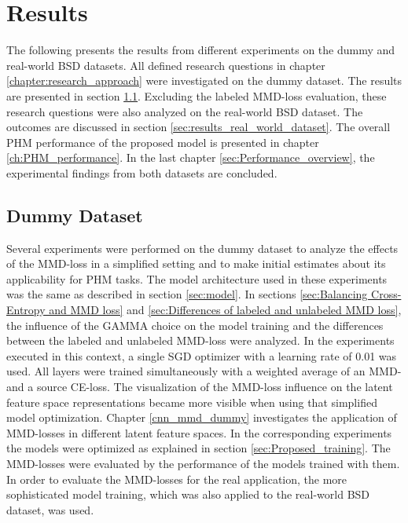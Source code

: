 \chapter{Results}\label{sec:results}

The following presents the results from different experiments on the dummy and real-world BSD datasets. All defined research questions in chapter \ref{chapter:research_approach} were investigated on the dummy dataset. The results are presented in section \ref{sec:results_dummy_dataset}. Excluding the labeled MMD-loss evaluation, these research questions were also analyzed on the real-world BSD dataset. The outcomes are discussed in section \ref{sec:results_real_world_dataset}. The overall PHM performance of the proposed model is presented in chapter \ref{ch:PHM_performance}. In the last chapter \ref{sec:Performance_overview}, the experimental findings from both datasets are concluded.




\section{Dummy Dataset}\label{sec:results_dummy_dataset}
Several experiments were performed on the dummy dataset to analyze the effects of the MMD-loss in a simplified setting and to make initial estimates about its applicability for PHM tasks. The model architecture used in these experiments was the same as described in section \ref{sec:model}. In sections \ref{sec:Balancing Cross-Entropy and MMD loss} and \ref{sec:Differences of labeled and unlabeled MMD loss}, the influence of the GAMMA choice on the model training and the differences between the labeled and unlabeled MMD-loss were analyzed. In the experiments executed in this context, a single SGD optimizer with a learning rate of 0.01 was used. All layers were trained simultaneously with a weighted average of an MMD- and a source CE-loss. The visualization of the MMD-loss influence on the latent feature space representations became more visible when using that simplified model optimization. Chapter \ref{cnn_mmd_dummy} investigates the application of MMD-losses in different latent feature spaces. In the corresponding experiments the models were optimized as explained in section \ref{sec:Proposed_training}. The MMD-losses were evaluated by the performance of the models trained with them. In order to evaluate the MMD-losses for the real application, the more sophisticated model training, which was also applied to the real-world BSD dataset, was used.


